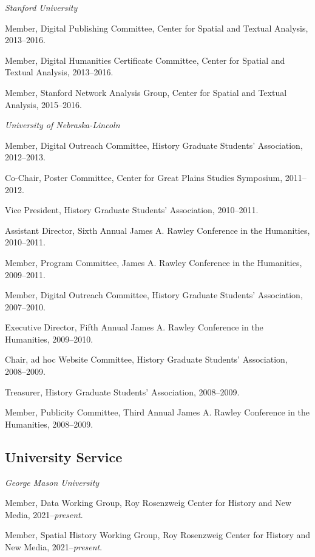 \documentclass[10pt]{article}
\begin{document}
\vspace{.4cm}

\textit{Stanford University}

Member, Digital Publishing Committee, Center for Spatial and Textual Analysis, 2013--2016.

Member, Digital Humanities Certificate Committee, Center for Spatial and Textual Analysis, 2013--2016.

Member, Stanford Network Analysis Group, Center for Spatial and Textual Analysis, 2015--2016.

\vspace{.4cm}

\textit{University of Nebraska-Lincoln}

Member, Digital Outreach Committee, History Graduate Students' Association, 2012--2013.

Co-Chair, Poster Committee, Center for Great Plains Studies Symposium, 2011--2012.

Vice President, History Graduate Students' Association, 2010--2011.

Assistant Director, Sixth Annual James A. Rawley Conference in the Humanities, 2010--2011.

Member, Program Committee, James A. Rawley Conference in the Humanities, 2009--2011.

Member, Digital Outreach Committee, History Graduate Students' Association, 2007--2010.

Executive Director, Fifth Annual James A. Rawley Conference in the Humanities, 2009--2010.

Chair, ad hoc Website Committee, History Graduate Students' Association, 2008--2009.

Treasurer, History Graduate Students' Association, 2008--2009.

Member, Publicity Committee, Third Annual James A. Rawley Conference in the Humanities, 2008--2009.

\subsection{University Service}

\textit{George Mason University}

Member, Data Working Group, Roy Rosenzweig Center for History and New Media, 2021--\textit{present}.

Member, Spatial History Working Group, Roy Rosenzweig Center for History and New Media, 2021--\textit{present}.
\end{document}
